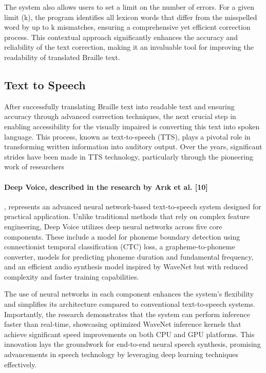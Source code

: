 The system also allows users to set a limit on the number of errors. For a given limit (k), the program identifies all lexicon words that differ from the misspelled word by up to k mismatches, ensuring a comprehensive yet efficient correction process. This contextual approach significantly enhances the accuracy and reliability of the text correction, making it an invaluable tool for improving the readability of translated Braille text.\\

 

\subsection{Text to Speech}


 After successfully translating Braille text into readable text and ensuring accuracy through advanced correction techniques, the next crucial step in enabling accessibility for the visually impaired is converting this text into spoken language. This process, known as text-to-speech (TTS), plays a pivotal role in transforming written information into auditory output. Over the years, significant strides have been made in TTS technology, particularly through the pioneering work of researchers

\paragraph{Deep Voice, described in the research by Arık et al. [10]}
, represents an advanced neural network-based text-to-speech system designed for practical application. Unlike traditional methods that rely on complex feature engineering, Deep Voice utilizes deep neural networks across five core components. These include a model for phoneme boundary detection using connectionist temporal classification (CTC) loss, a grapheme-to-phoneme converter, models for predicting phoneme duration and fundamental frequency, and an efficient audio synthesis model inspired by WaveNet but with reduced complexity and faster training capabilities.

The use of neural networks in each component enhances the system's flexibility and simplifies its architecture compared to conventional text-to-speech systems. Importantly, the research demonstrates that the system can perform inference faster than real-time, showcasing optimized WaveNet inference kernels that achieve significant speed improvements on both CPU and GPU platforms. This innovation lays the groundwork for end-to-end neural speech synthesis, promising advancements in speech technology by leveraging deep learning techniques effectively.

